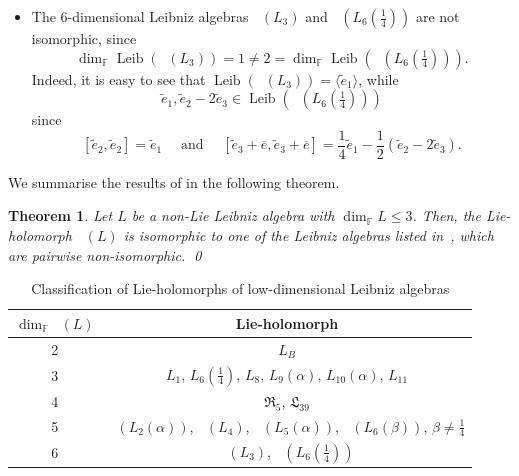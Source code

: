 \documentclass[11pt,a4paper]{amsart}
\theoremstyle{plain}
\newtheorem{theorem}[subsection]{Theorem}
\theoremstyle{definition}
\theoremstyle{remark}
\numberwithin{equation}{section}
\newcommand{\noproof}{\hfil\qed}
\newcommand{\0}{\emptyset}
\newcommand{\bF}{\mathbb{F}}
\DeclareMathOperator{\Leib}{Leib}
\DeclareMathOperator{\holL}{hol_{Lie}}
\newcommand{\ov}[1]{\overline{#1}}
\begin{document}
\begin{itemize}[itemsep=0.35em]
	\item The $6$-dimensional Leibniz algebras $\holL(L_3)$ and $\holL(L_6\left(\tfrac{1}{4}\right))$ are not isomorphic, since
    \begin{equation*}
\dim_{\bF}\Leib\left(\holL(L_3)\right)=1\neq 2= \dim_{\bF}\Leib\left(\holL\left(L_6\left(\tfrac{1}{4}\right)\right)\right).
    \end{equation*}
    Indeed, it is easy to see that $\Leib(\holL(L_3))=\langle \widetilde{e}_1 \rangle$, while
    \[
    \widetilde{e}_1, \widetilde{e}_2-2 \widetilde{e}_3 \in \Leib\left(\holL\left(L_6\left(\tfrac{1}{4}\right)\right)\right)
    \]
    since
    \[
[\widetilde{e}_2,\widetilde{e}_2]=\widetilde{e}_1 \quad \text{ and } \quad [\widetilde{e}_3+\ov{e},\widetilde{e}_3+\ov{e}]=\frac{1}{4}\widetilde{e}_1-\frac{1}{2}(\widetilde{e}_2-2\widetilde{e}_3). \]
\end{itemize}

We summarise the results of  in the following theorem.

\begin{theorem}
Let $L$ be a non-Lie Leibniz algebra with $\dim_\bF L \leq 3$. Then, the Lie-holomorph $\holL(L)$ is isomorphic to one of the Leibniz algebras listed in~, which are pairwise non-isomorphic.
\noproof
\end{theorem}

\renewcommand{\arraystretch}{1.4}

\begin{table}[H]
	\centering
	\caption{Classification of Lie-holomorphs of low-dimensional Leibniz algebras}
	\label{tab:holomorphs}
	\begin{tabular}{|c|c|}
		\hline
		$\dim_\bF \holL(L)$ & \textbf{Lie-holomorph}                                                                                   \\ \hline
		2                            & $L_B$                                                                                                    \\ \hline
		3                            & $L_1$, $L_6\left(\tfrac{1}{4}\right)$, $L_8$, $L_9(\alpha)$, $L_{10}(\alpha)$, $L_{11}$                  \\ \hline
		4                            & $\mathfrak{R}_5$, $\mathfrak{L}_{39}$                                                                    \\ \hline
		5                            & $\holL(L_2(\alpha))$, $\holL(L_4)$, $\holL(L_5(\alpha))$, $\holL(L_6(\beta))$, $\beta \neq \tfrac{1}{4}$ \\ \hline
		6                            & $\holL(L_3)$, $\holL\left(L_6\left(\frac{1}{4}\right)\right)$                                            \\ \hline
	\end{tabular}
\end{table}
\end{document}
